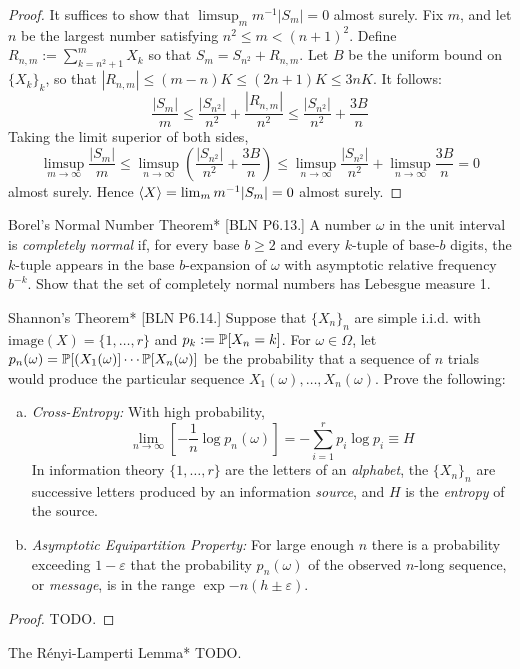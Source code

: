 \begin{proof}
    It suffices to show that \(\limsup_m m^{-1} |S_m| = 0\) almost surely. Fix \(m\), and let \(n\) be the largest number satisfying \(n^2 \leq m < (n+1)^2\). Define \(R_{n,m} := \sum_{k=n^2+1}^m X_k\) so that \(S_m = S_{n^2} + R_{n,m}\). Let \(B\) be the uniform bound on \(\{X_k\}_k\), so that \(|R_{n,m}| \leq (m-n) K \leq (2n+1) K \leq 3nK\). It follows: 
    \[
        \frac{|S_m|}{m} \leq \frac{|S_{n^2}|}{n^2} + \frac{|R_{n,m}|}{n^2} \leq \frac{|S_{n^2}|}{n^2} + \frac{3B}{n}
    \]
    Taking the limit superior of both sides, 
    \[
        \limsup_{m \to \infty} \frac{|S_m|}{m} 
        \leq \limsup_{n \to \infty} \left( \frac{|S_{n^2}|}{n^2} + \frac{3B}{n} \right)
        \leq \limsup_{n \to \infty} \frac{|S_{n^2}|}{n^2} + \limsup_{n \to \infty} \frac{3B}{n}
        = 0
    \]
    almost surely. Hence \(\ev{X} = \lim_m m^{-1} |S_m| = 0\) almost surely. 
\end{proof}


\begin{problem}{Borel's Normal Number Theorem}*
    [BLN P6.13.] A number \(\omega\) in the unit interval is \emph{completely normal} if, for every base \(b \geq 2\) and every \(k\)-tuple of base-\(b\) digits, the \(k\)-tuple appears in the base \(b\)-expansion of \(\omega\) with asymptotic relative frequency \(b^{-k}\). Show that the set of completely normal numbers has Lebesgue measure 1. 
\end{problem}


\begin{problem}{Shannon's Theorem}*
    [BLN P6.14.] Suppose that \(\{X_n\}_n\) are simple i.i.d. with \(\text{image}(X) = \{1, \dots, r\}\) and \(p_k := \mathbb{P}[X_n = k]\). For \(\omega \in \Omega\), let \(p_n(\omega) = \mathbb{P}[(X_1(\omega)] \cdots \mathbb{P}[X_n(\omega)]\) be the probability that a sequence of \(n\) trials would produce the particular sequence \(X_1(\omega), \dots, X_n(\omega)\). Prove the following: 
    \begin{enumerate}[(a)]
        \itemsep0em
        \item \emph{Cross-Entropy:} With high probability, 
        \[
            \lim_{n \to \infty} \left[ - \frac{1}{n} \log p_n(\omega) \right] = - \sum_{i=1}^r p_i \log p_i \equiv H
        \]
        In information theory \(\{1, \dots, r\}\) are the letters of an \emph{alphabet}, the \(\{X_n\}_n\) are successive letters produced by an information \emph{source}, and \(H\) is the \emph{entropy} of the source. 
        \item \emph{Asymptotic Equipartition Property:} For large enough \(n\) there is a probability exceeding \(1 - \varepsilon\) that the probability \(p_n(\omega)\) of the observed \(n\)-long sequence, or \emph{message}, is in the range \(\exp{-n(h \pm \varepsilon)}\).
    \end{enumerate}
\end{problem}

\begin{proof}
    TODO. 
\end{proof}


\begin{problem}{The R\'enyi-Lamperti Lemma}*
    TODO. 
\end{problem}



